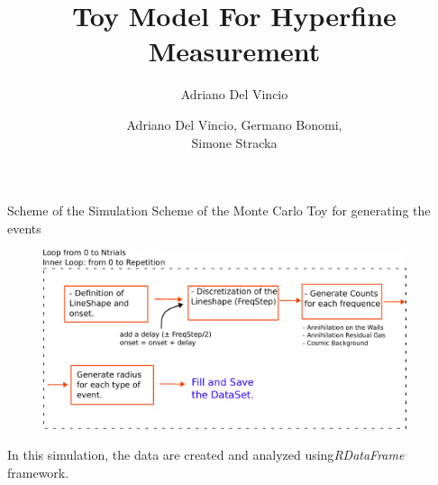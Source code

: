 \documentclass[8pt]{beamer}
\author{Adriano Del Vincio}
\title[Alpha 2]{Toy Model For Hyperfine Measurement}
\author[Adriano, Germano, Simone]{Adriano Del Vincio, Germano Bonomi,\\ Simone Stracka}
\institute[]{University of Brescia, INFN Pisa}
\begin{document}
\begin{frame}
\titlepage
\end{frame}


\begin{frame}{Scheme of the Simulation}
Scheme of the Monte Carlo Toy for generating the events

\begin{figure}
\centering
\includegraphics[width = 0.95\textwidth]{SimulationScheme.pdf}
\end{figure}

\begin{center}
In this simulation, the data are created and analyzed using\newline \textit{RDataFrame} framework.
\end{center}

\end{frame}
\end{document}
